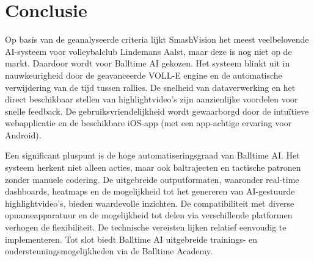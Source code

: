 \section{Conclusie}
Op basis van de geanalyseerde criteria lijkt SmashVision het meest veelbelovende AI-systeem voor volleybalclub Lindemans Aalst, maar deze is nog niet op de markt. Daardoor wordt voor Balltime AI gekozen. Het systeem blinkt uit in nauwkeurigheid door de geavanceerde VOLL-E engine en de automatische verwijdering van de tijd tussen rallies. De snelheid van dataverwerking en het direct beschikbaar stellen van highlightvideo's zijn aanzienlijke voordelen voor snelle feedback. De gebruiksvriendelijkheid wordt gewaarborgd door de intuïtieve webapplicatie en de beschikbare iOS-app (met een app-achtige ervaring voor Android).

Een significant pluspunt is de hoge automatiseringsgraad van Balltime AI. Het systeem herkent niet alleen acties, maar ook baltrajecten en tactische patronen zonder manuele codering. De uitgebreide outputformaten, waaronder real-time dashboards, heatmaps en de mogelijkheid tot het genereren van AI-gestuurde highlightvideo's, bieden waardevolle inzichten. De compatibiliteit met diverse opnameapparatuur en de mogelijkheid tot delen via verschillende platformen verhogen de flexibiliteit. De technische vereisten lijken relatief eenvoudig te implementeren. Tot slot biedt Balltime AI uitgebreide trainings- en ondersteuningsmogelijkheden via de Balltime Academy.
